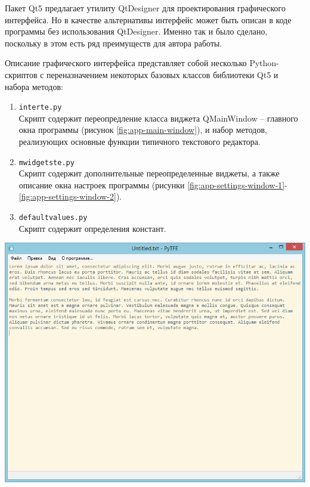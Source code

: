 Пакет Qt5 предлагает утилиту QtDesigner для проектирования
графического интерфейса. Но в качестве альтернативы интерфейс может быть
описан в коде программы без использования QtDesigner. Именно так и было
сделано, поскольку в этом есть ряд преимуществ для автора работы.

Описание графического интерфейса представляет собой несколько Python-скриптов
с переназначением некоторых базовых классов библиотеки Qt5 и набора методов:
\begin{enumerate}
    \item \texttt{interte.py}\\
    Скрипт содержит переопредление класса виджета QMainWindow --
    главного окна программы (рисунок \ref{fig:app-main-window}),
    и набор методов, реализующих основные функции типичного текстового редактора.
    \item \texttt{mwidgetste.py}\\
    Скрипт содержит дополнительные переопределенные виджеты, а также
    описание окна настроек программы
    (рисунки \ref{fig:app-settings-window-1}-\ref{fig:app-settings-window-2}).
    \item \texttt{defaultvalues.py}\\
    Скрипт содержит определения констант.
\end{enumerate}

\noindent
\begin{minipage}{\linewidth}
  \vspace{3.5mm}
  \centering
  \includegraphics[scale=0.6]{./pics/te/app-main-window.png}
  \label{fig:app-main-window}
  \vspace{3.5mm}
\end{minipage}

